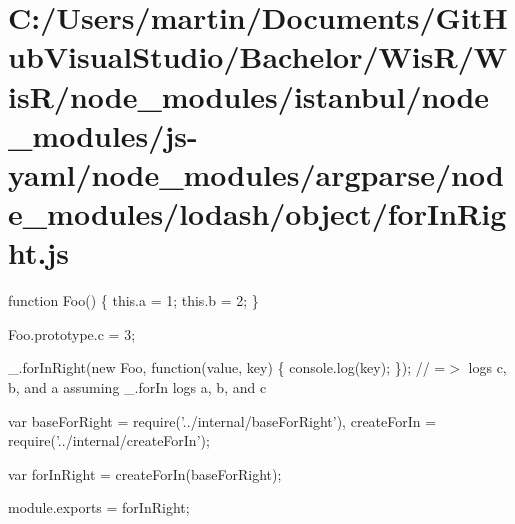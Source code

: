 \hypertarget{_c_1_2_users_2martin_2_documents_2_git_hub_visual_studio_2_bachelor_2_wis_r_2_wis_r_2node_module91d7f4e0e50fec978a94100462d29b29}{}\section{C\+:/\+Users/martin/\+Documents/\+Git\+Hub\+Visual\+Studio/\+Bachelor/\+Wis\+R/\+Wis\+R/node\+\_\+modules/istanbul/node\+\_\+modules/js-\/yaml/node\+\_\+modules/argparse/node\+\_\+modules/lodash/object/for\+In\+Right.\+js}
function Foo() \{ this.\+a = 1; this.\+b = 2; \}

Foo.\+prototype.\+c = 3;

\+\_\+.\+for\+In\+Right(new Foo, function(value, key) \{ console.\+log(key); \}); // =$>$ logs \textquotesingle{}c\textquotesingle{}, \textquotesingle{}b\textquotesingle{}, and \textquotesingle{}a\textquotesingle{} assuming {\ttfamily \+\_\+.\+for\+In} logs \textquotesingle{}a\textquotesingle{}, \textquotesingle{}b\textquotesingle{}, and \textquotesingle{}c\textquotesingle{}


\begin{DoxyCodeInclude}
var baseForRight = require(\textcolor{stringliteral}{'../internal/baseForRight'}),
    createForIn = require(\textcolor{stringliteral}{'../internal/createForIn'});

var forInRight = createForIn(baseForRight);

module.exports = forInRight;
\end{DoxyCodeInclude}
 